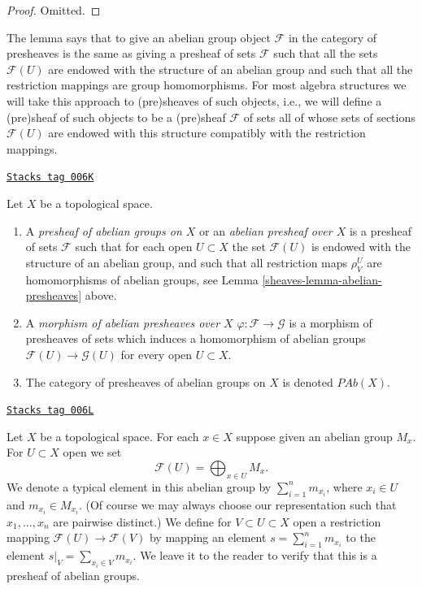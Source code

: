 \begin{proof}
Omitted.
\end{proof}

The lemma says that to give an abelian group object $\mathcal{F}$
in the category of presheaves is the same as giving a presheaf of sets
$\mathcal{F}$ such that all the sets $\mathcal{F}(U)$ are endowed
with the structure of an abelian group and such that all the restriction
mappings are group homomorphisms. For most algebra structures
we will take this approach to (pre)sheaves of such objects, i.e.,
we will define a (pre)sheaf of such objects to be a (pre)sheaf
$\mathcal{F}$ of sets all of whose sets of sections $\mathcal{F}(U)$
are endowed with this structure compatibly with the restriction
mappings.

\begin{definition}
\label{sheaves-definition-abelian-presheaves}
\href{https://stacks.math.columbia.edu/tag/006K}{\texttt{Stacks tag 006K}}

Let $X$ be a topological space.
\begin{enumerate}
\item A {\it presheaf of abelian groups on $X$} or an
{\it abelian presheaf over $X$}
is a presheaf of sets $\mathcal{F}$ such that for each open
$U \subset X$ the set $\mathcal{F}(U)$ is endowed with
the structure of an abelian group, and such that all restriction
maps $\rho^U_V$ are homomorphisms of abelian groups, see
Lemma \ref{sheaves-lemma-abelian-presheaves} above.
\item A {\it morphism of abelian presheaves over $X$}
$\varphi : \mathcal{F} \to \mathcal{G}$ is a morphism of presheaves
of sets which induces
a homomorphism of abelian groups $\mathcal{F}(U) \to \mathcal{G}(U)$
for every open $U \subset X$.
\item The category of presheaves of abelian groups on $X$ is denoted
$\textit{PAb}(X)$.
\end{enumerate}
\end{definition}

\begin{example}
\label{sheaves-example-direct-sum-points}
\href{https://stacks.math.columbia.edu/tag/006L}{\texttt{Stacks tag 006L}}

Let $X$ be a topological space. For each $x \in X$ suppose
given an abelian group $M_x$. For $U \subset X$ open
we set
$$
\mathcal{F}(U) = \bigoplus\nolimits_{x \in U} M_x.
$$
We denote a typical element in this abelian group by
$\sum_{i = 1}^n m_{x_i}$, where $x_i \in U$ and $m_{x_i} \in M_{x_i}$.
(Of course we may always choose our representation such that
$x_1, \ldots, x_n$ are pairwise distinct.)
We define for $V \subset U \subset X$ open a restriction
mapping $\mathcal{F}(U) \to \mathcal{F}(V)$ by
mapping an element $s = \sum_{i = 1}^n m_{x_i}$
to the element $s|_V = \sum_{x_i \in V} m_{x_i}$.
We leave it to the reader to verify that this is a
presheaf of abelian groups.
\end{example}

